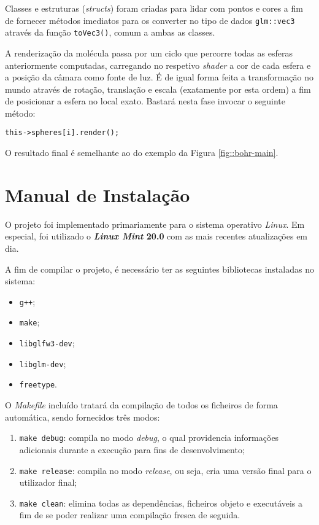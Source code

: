 Classes e estruturas (\textit{structs}) foram criadas para lidar com pontos e cores a fim de fornecer métodos imediatos para os converter no tipo de dados \verb|glm::vec3| através da função \verb|toVec3()|, comum a ambas as classes.

A renderização da molécula passa por um ciclo que percorre todas as esferas anteriormente computadas, carregando no respetivo \textit{shader} a cor de cada esfera e a posição da câmara como fonte de luz. É de igual forma feita a transformação no mundo através de rotação, translação e escala (exatamente por esta ordem) a fim de posicionar a esfera no local exato. Bastará nesta fase invocar o seguinte método:

\begin{verbatim}
this->spheres[i].render();
\end{verbatim}

O resultado final é semelhante ao do exemplo da Figura \ref{fig::bohr-main}.


\section{Manual de Instalação}
\label{sec::implement:instalar}

O projeto foi implementado primariamente para o sistema operativo \textit{Linux}. Em especial, foi utilizado o \textbf{\textit{Linux Mint} 20.0} com as mais recentes atualizações em dia.

A fim de compilar o projeto, é necessário ter as seguintes bibliotecas instaladas no sistema:

\begin{itemize}[nosep]
    \item \verb|g++|;
    \item \verb|make|;
    \item \verb|libglfw3-dev|;
    \item \verb|libglm-dev|;
    \item \verb|freetype|.
\end{itemize}

O \textit{Makefile} incluído tratará da compilação de todos os ficheiros de forma automática, sendo fornecidos três modos:

\begin{enumerate}
    \item \verb|make debug|: compila no modo \textit{debug}, o qual providencia informações adicionais durante a execução para fins de desenvolvimento;
    \item \verb|make release|: compila no modo \textit{release}, ou seja, cria uma versão final para o utilizador final;
    \item \verb|make clean|: elimina todas as dependências, ficheiros objeto e executáveis a fim de se poder realizar uma compilação fresca de seguida.
\end{enumerate}


